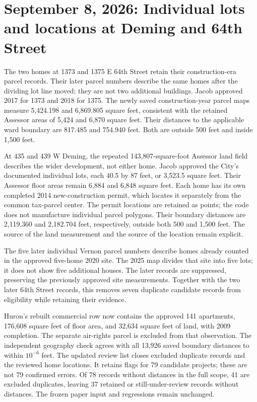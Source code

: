 \section*{September 8, 2026: Individual lots and locations at Deming and 64th Street}

The two homes at 1373 and 1375 E 64th Street retain their construction-era parcel records. Their later parcel numbers describe the same homes after the dividing lot line moved; they are not two additional buildings. Jacob approved 2017 for 1373 and 2018 for 1375. The newly saved construction-year parcel maps measure 5,424.198 and 6,869.805 square feet, consistent with the retained Assessor areas of 5,424 and 6,870 square feet. Their distances to the applicable ward boundary are 817.485 and 754.940 feet. Both are outside 500 feet and inside 1,500 feet.

At 435 and 439 W Deming, the repeated 143,807-square-foot Assessor land field describes the wider development, not either home. Jacob approved the City's documented individual lots, each 40.5 by 87 feet, or 3,523.5 square feet. Their Assessor floor areas remain 6,884 and 6,848 square feet. Each home has its own completed 2014 new-construction permit, which locates it separately from the common tax-parcel center. The permit locations are retained as points; the code does not manufacture individual parcel polygons. Their boundary distances are 2,119.360 and 2,182.704 feet, respectively, outside both 500 and 1,500 feet. The source of the land measurement and the source of the location remain explicit.

The five later individual Vernon parcel numbers describe homes already counted in the approved five-home 2020 site. The 2025 map divides that site into five lots; it does not show five additional houses. The later records are suppressed, preserving the previously approved site measurements. Together with the two later 64th Street records, this removes seven duplicate candidate records from eligibility while retaining their evidence.

Huron's rebuilt commercial row now contains the approved 141 apartments, 176,608 square feet of floor area, and 32,634 square feet of land, with 2009 completion. The separate air-rights parcel is excluded from that observation. The independent geography check agrees with all 13,926 saved boundary distances to within $10^{-6}$ feet. The updated review list closes excluded duplicate records and the reviewed home locations. It retains flags for 79 candidate projects; these are not 79 confirmed errors. Of 78 records without distances in the full scope, 41 are excluded duplicates, leaving 37 retained or still-under-review records without distances. The frozen paper input and regressions remain unchanged.

